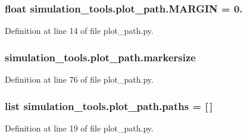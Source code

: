 \subsubsection[{\texorpdfstring{M\+A\+R\+G\+IN}{MARGIN}}]{\setlength{\rightskip}{0pt plus 5cm}float simulation\+\_\+tools.\+plot\+\_\+path.\+M\+A\+R\+G\+IN = 0.}\hypertarget{namespacesimulation__tools_1_1plot__path_af2865d4107cb8424c272f2214d7bc7e3}{}\label{namespacesimulation__tools_1_1plot__path_af2865d4107cb8424c272f2214d7bc7e3}


Definition at line 14 of file plot\+\_\+path.\+py.

\subsubsection[{\texorpdfstring{markersize}{markersize}}]{\setlength{\rightskip}{0pt plus 5cm}simulation\+\_\+tools.\+plot\+\_\+path.\+markersize}\hypertarget{namespacesimulation__tools_1_1plot__path_aba6bb0b70b3a96a476e7a1553491bd33}{}\label{namespacesimulation__tools_1_1plot__path_aba6bb0b70b3a96a476e7a1553491bd33}


Definition at line 76 of file plot\+\_\+path.\+py.

\subsubsection[{\texorpdfstring{paths}{paths}}]{\setlength{\rightskip}{0pt plus 5cm}list simulation\+\_\+tools.\+plot\+\_\+path.\+paths = \mbox{[}$\,$\mbox{]}}\hypertarget{namespacesimulation__tools_1_1plot__path_abb450e0cef13d97a4f8368a6d00ff843}{}\label{namespacesimulation__tools_1_1plot__path_abb450e0cef13d97a4f8368a6d00ff843}


Definition at line 19 of file plot\+\_\+path.\+py.

